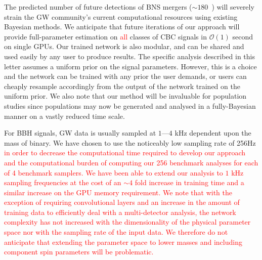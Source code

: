 \documentclass[%
showpacs,
nofootinbib,
 amsmath,amssymb,
 aps,
 twocolumn,
 prl,
 reprint,
floatfix,
]{revtex4-1}
\newcommand{\new}[1]{\textcolor{red}{#1}}
\begin{document}
%
%
The predicted number of future detections of \ac{BNS} mergers ($\sim
180$~\cite{2018LRR....21....3A}) will severely strain the \ac{GW} community's
current computational resources using existing Bayesian methods. We anticipate
that future iterations of our approach will provide full-parameter estimation
on \new{all} classes of \ac{CBC} signals in $\mathcal{O}(1)$ second on single
\acp{GPU}. Our trained network is also modular, and can be shared and used
easily by any user to produce results. The specific analysis described in this
letter assumes a uniform prior on the signal parameters. However, this is a
choice and the network can be trained with any prior the user demands, or users
can cheaply resample accordingly from the output of the network trained on the
uniform prior. We also note that our method will be invaluable for population
studies since populations may now be generated and analysed in a fully-Bayesian
manner on a vastly reduced time scale. 

%
%
For \ac{BBH} signals, \ac{GW} data is usually sampled at $1$---$4$ kHz
dependent upon the mass of binary. We have chosen to use the noticeably low
sampling rate of 256Hz \new{in order to decrease the computational time
required to develop our approach and the computational burden of computing our
256 benchmark analyses for each of 4 benchmark samplers. We have been able to
extend our analysis to $1$ kHz sampling frequencies at the cost of an $\sim4$
fold increase in training time and a similar increase on the \ac{GPU} memory
requirement. We note that with the exception of requiring convolutional layers
and an increase in the amount of training data to efficiently deal with a
multi-detector analysis, the network complexity has not increased with the
dimensionality of the physical parameter space nor with the sampling rate of
the input data. We therefore do not anticipate that extending the parameter
space to lower masses and including component spin parameters will be
problematic.} 
\end{document}
